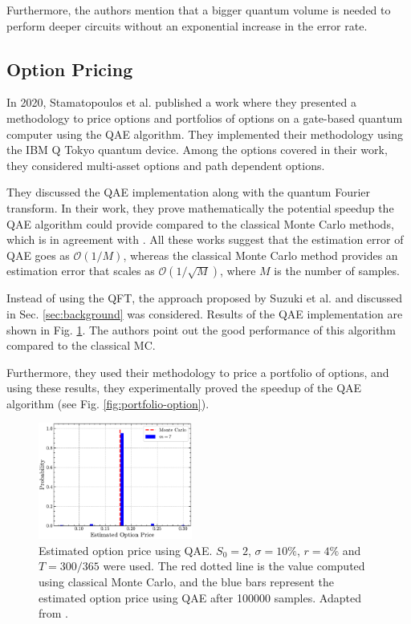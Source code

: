 \documentclass[prx,twocolumn,floatfix,superscriptaddress,longbibliography]{revtex4-1}
\begin{document}
Furthermore, the authors mention that a bigger quantum volume is needed to perform deeper circuits without  an exponential 
increase in the error rate. 


\subsection{Option Pricing}
In 2020, Stamatopoulos et al. \cite{Stamatopoulos2020} published a work where they presented a methodology to price options and portfolios of options on a gate-based quantum computer using the QAE algorithm. They implemented their methodology using the IBM Q Tokyo quantum device. Among 
the options covered in their work, they considered multi-asset options and path dependent options.

They discussed the QAE implementation along with the quantum Fourier transform. In their work, they prove mathematically the potential speedup the QAE algorithm could provide compared to the classical Monte Carlo methods, which is in agreement with \cite{Woerner2019, Nakaji2020,Rebentrost2018, Rebentrost2022}. All these works suggest that the estimation error of QAE goes as $\mathcal{O}(1/M)$, whereas the classical Monte Carlo method provides an estimation error that scales as $\mathcal{O}(1/\sqrt{M})$, where $M$ is the number of samples.

Instead of using the QFT, the approach proposed by Suzuki et al. \cite{Suzuki2020} and discussed in Sec. \ref{sec:background} was considered.
Results of the QAE implementation are shown in Fig. \ref{fig:results-qae}. The authors point out the good performance of this algorithm compared to the classical MC.

Furthermore, they used their methodology to price a portfolio of options, and using these results, they experimentally proved the speedup of the QAE algorithm (see Fig. \ref{fig:portfolio-option}).

\begin{figure}[h!]
\centering
\includegraphics[width=0.45\textwidth]{option-price-estimation.pdf}
  \caption{\label{fig:results-qae} Estimated option price using QAE. $S_0 = 2$, $ \sigma = 10\%$, $r = 4\%$ and $T=300/365$ were used. The red dotted line is the value computed using classical Monte Carlo, and the blue bars represent the estimated option price using QAE after 100000 samples. Adapted  from \cite{Stamatopoulos2020}.}
\end{figure}
\end{document}
